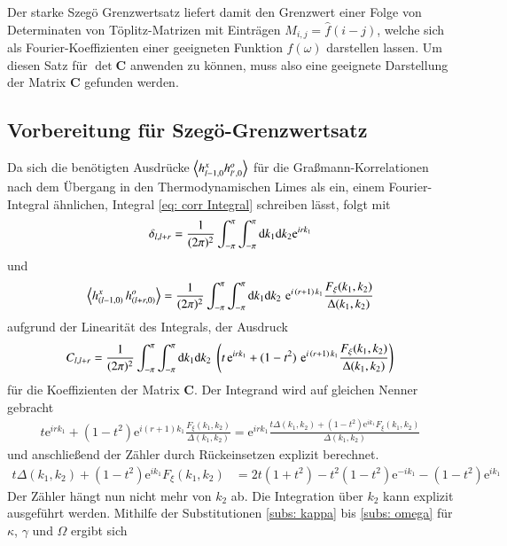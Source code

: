 \noindent Der starke Szegö Grenzwertsatz liefert damit den Grenzwert einer Folge von Determinaten von Töplitz-Matrizen mit Einträgen $M_{i,j} = \hat{f}(i-j)$, welche sich als Fourier-Koeffizienten einer geeigneten Funktion $f(\omega)$ darstellen lassen. Um diesen Satz für $\det{\bm{C}}$ anwenden zu können, muss also eine geeignete Darstellung der Matrix $\bm{C}$ gefunden werden.

\subsection{Vorbereitung für Szegö-Grenzwertsatz}

Da sich die benötigten Ausdrücke $\left\langle h_{l-1,0}^x h_{l',0}^o \right\rangle$ für die Graßmann-Korrelationen nach dem Übergang in den Thermodynamischen Limes als ein, einem Fourier-Integral ähnlichen, Integral \eqref{eq: corr Integral} schreiben lässt, folgt mit
\begin{equation}
\delta_{l,l+r} = \frac{1}{(2\pi)^2} \int_{-\pi}^{\pi}\int_{-\pi}^{\pi} \mathrm{d} k_1 \mathrm{d} k_2 \mathrm{e}^{i  r k_1}
\end{equation}
und
\begin{equation}
\left\langle h^{x}_{(l-1,0)}\, h^{o}_{(l+r, 0)}  \right\rangle = \frac{1}{(2\pi)^2}\int_{-\pi}^{\pi} \int_{-\pi}^{\pi} \mathrm{d} k_1 \mathrm{d} k_2 \,\,\mathrm{e}^{i\, (r+1) \,k_1} \frac{F_{\xi}(k_1,k_2)}{\Delta(k_1, k_2)} 
\end{equation}
aufgrund der Linearität des Integrals, der Ausdruck
\begin{equation}
C_{l,l+r} = \frac{1}{(2\pi)^2} \int_{-\pi}^{\pi}\int_{-\pi}^{\pi} \mathrm{d} k_1 \mathrm{d} k_2 \;\left( t\,\mathrm{e}^{i  r k_1} + (1-t^2) \,\,\mathrm{e}^{i\, (r+1) \,k_1} \frac{F_{\xi}(k_1,k_2)}{\Delta(k_1, k_2)} \right)
\end{equation}
für die Koeffizienten der Matrix $\bm{C}$.
Der Integrand wird auf gleichen Nenner gebracht
\begin{align}
t\mathrm{e}^{i  r k_1} + (1-t^2)\mathrm{e}^{i(r+1)k_1}\frac{F_{\xi}(k_1,k_2)}{\Delta(k_1, k_2)} = \mathrm{e}^{i  r k_1} \frac{t \Delta(k_1, k_2) + (1-t^2) \mathrm{e}^{ik_1} F_{\xi}(k_1,k_2)}{\Delta(k_1, k_2)} \nonumber
\end{align}
und anschließend der Zähler durch Rückeinsetzen explizit berechnet.
\begin{align}
t \Delta(k_1, k_2) + (1-t^2)\mathrm{e}^{ik_1} F_{\xi}(k_1,k_2) &= 2t(1+t^2) - t^2(1-t^2)\mathrm{e}^{-i k_1} - (1-t^2)\mathrm{e}^{i k_1} %
\end{align}
Der Zähler hängt nun nicht mehr von $k_2$ ab. Die Integration über $k_2$ kann explizit ausgeführt werden. Mithilfe der Substitutionen \eqref{subs: kappa} bis \eqref{subs: omega} für $\kappa$, $\gamma$ und $\Omega$ ergibt sich
